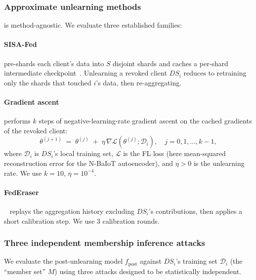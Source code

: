 \subsubsection{Approximate unlearning methods}

\sysname is method-agnostic. We evaluate three established families:

\paragraph{SISA-Fed} pre-shards each client's data into $S$ disjoint
shards and caches a per-shard intermediate
checkpoint~\cite{bourtoule2021sisa}. Unlearning a revoked client
$\mathit{DS}_i$ reduces to retraining only the shards that touched
$i$'s data, then re-aggregating.

\paragraph{Gradient ascent} performs $k$ steps of negative-learning-rate
gradient ascent on the cached gradients of the revoked client:
\begin{equation}\label{eq:gradascent}
    \theta^{(j+1)} \;=\; \theta^{(j)} \;+\; \eta \,\nabla
        \mathcal{L}\!\left(\theta^{(j)}; \mathcal{D}_i\right),
    \quad j = 0, 1, \ldots, k\!-\!1,
\end{equation}
where $\mathcal{D}_i$ is $\mathit{DS}_i$'s local training set,
$\mathcal{L}$ is the FL loss (here mean-squared reconstruction error
for the N-BaIoT autoencoder), and $\eta > 0$ is the unlearning rate.
We use $k=10$, $\eta = 10^{-4}$.

\paragraph{FedEraser}~\cite{liu2021federaser} replays the aggregation
history excluding $\mathit{DS}_i$'s contributions, then applies a
short calibration step. We use $3$ calibration rounds.

\subsubsection{Three independent membership inference attacks}

We evaluate the post-unlearning model $f_{\mathrm{post}}$ against
$\mathit{DS}_i$'s training set $\mathcal{D}_i$ (the ``member set''
$M$) using three attacks designed to be statistically independent.

